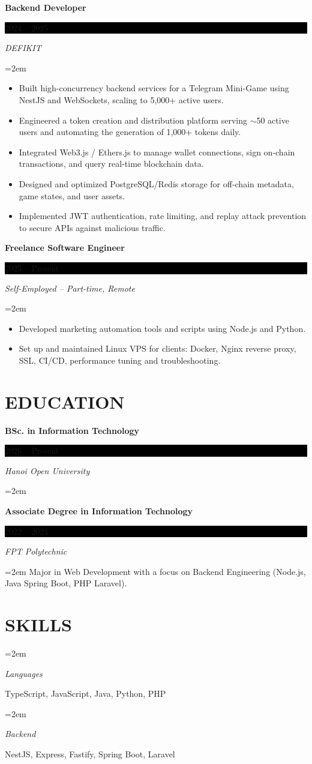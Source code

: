 \documentclass[paper=a4,fontsize=11pt]{scrartcl} %
\newlength{\spacebox}
\newcommand{\sepspace}{\vspace*{1em}}     %
\newcommand{\NewPart}[1]{\section*{\uppercase{#1}}}
\newcommand{\PersonalEntry}[2]{
		\noindent\hangindent=2em\hangafter=0 %
		\parbox{\spacebox}{        %
		\textit{#1}}               %
		\hspace{1.5em} #2 \par}    %
\let\SkillsEntry\PersonalEntry     %
\newcommand{\EducationEntry}[4]{
		\noindent \textbf{#1} \hfill      %
		\colorbox{Black}{%
			\parbox{7.5em}{%
			\hfill\color{White}#2}} \par  %
		\noindent \textit{#3} \par        %
		\noindent\hangindent=2em\hangafter=0 \small #4 %
		\normalsize \par}
\let\WorkExperienceEntry\EducationEntry  %
\begin{document}
\WorkExperienceEntry{Backend Developer}{2024 -- 2025}{DEFIKIT}{
\begin{itemize}\setlength{\itemsep}{1pt}\parskip0pt\parsep0pt
    \item Built high-concurrency backend services for a Telegram Mini-Game using NestJS and WebSockets, scaling to 5,000+ active users.
    \item Engineered a token creation and distribution platform serving $\sim$50 active users and automating the generation of 1,000+ tokens daily.
    \item Integrated Web3.js / Ethers.js to manage wallet connections, sign on-chain transactions, and query real-time blockchain data.
    \item Designed and optimized PostgreSQL/Redis storage for off-chain metadata, game states, and user assets.
    \item Implemented JWT authentication, rate limiting, and replay attack prevention to secure APIs against malicious traffic.
\end{itemize}
}

\sepspace

\WorkExperienceEntry{Freelance Software Engineer}{2025 -- Present}{Self-Employed -- Part-time, Remote}{
\begin{itemize}\setlength{\itemsep}{1pt}\parskip0pt\parsep0pt
    \item Developed marketing automation tools and scripts using Node.js and Python.
    \item Set up and maintained Linux VPS for clients: Docker, Nginx reverse proxy, SSL, CI/CD, performance tuning and troubleshooting.
\end{itemize}
}

\NewPart{Education}{}

\EducationEntry{BSc. in Information Technology}{2026 -- Present}{Hanoi Open University}{}

\sepspace

\EducationEntry{Associate Degree in Information Technology}{2022 -- 2024}{FPT Polytechnic}{Major in Web Development with a focus on Backend Engineering (Node.js, Java Spring Boot, PHP Laravel).}

\NewPart{Skills}{}

\SkillsEntry{Languages}{TypeScript, JavaScript, Java, Python, PHP}

\SkillsEntry{Backend}{NestJS, Express, Fastify, Spring Boot, Laravel}
\end{document}
